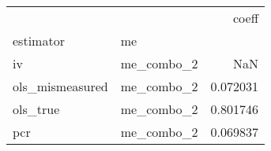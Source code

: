\begin{tabular}{llr}
\toprule
    &            &     coeff \\
estimator & me &           \\
\midrule
iv & me\_combo\_2 &       NaN \\
ols\_mismeasured & me\_combo\_2 &  0.072031 \\
ols\_true & me\_combo\_2 &  0.801746 \\
pcr & me\_combo\_2 &  0.069837 \\
\bottomrule
\end{tabular}
